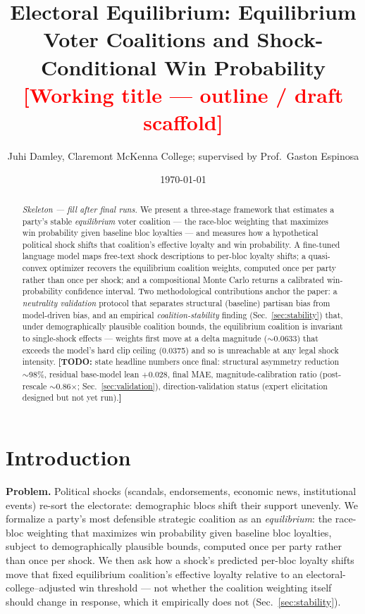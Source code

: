 \documentclass[11pt]{article}
\title{Electoral Equilibrium: Equilibrium Voter Coalitions and
Shock-Conditional Win Probability\\[4pt]
\large\textcolor{red}{[Working title --- outline / draft scaffold]}}
\author{Juhi Damley,
Claremont McKenna College; supervised by Prof.~Gaston Espinosa}
\date{\today}
\newcommand{\todo}[1]{{\color{red}\textbf{[TODO:} #1\textbf{]}}}
\newcommand{\stub}[1]{{\color{RoyalBlue}\emph{#1}}}
\begin{document}
\maketitle

\begin{abstract}
\stub{Skeleton --- fill after final runs.}
We present a three-stage framework that estimates a party's stable
\emph{equilibrium} voter coalition --- the race-bloc weighting that maximizes
win probability given baseline bloc loyalties --- and measures how a
hypothetical political shock shifts that coalition's effective loyalty and win
probability. A fine-tuned language model maps free-text shock descriptions to
per-bloc loyalty shifts; a quasi-convex optimizer recovers the equilibrium
coalition weights, computed once per party rather than once per shock; and a
compositional Monte Carlo returns a calibrated win-probability confidence
interval. Two methodological contributions anchor the paper: a \emph{neutrality
validation} protocol that separates structural (baseline) partisan bias from
model-driven bias, and an empirical \emph{coalition-stability} finding
(Sec.~\ref{sec:stability}) that, under demographically plausible coalition
bounds, the equilibrium coalition is invariant to single-shock effects ---
weights first move at a delta magnitude ($\sim$0.0633) that exceeds the model's
hard clip ceiling (0.0375) and so is unreachable at any legal shock intensity.
\todo{state headline numbers once final: structural asymmetry reduction
$\sim$98\%, residual base-model lean $+0.028$, final MAE, magnitude-calibration
ratio (post-rescale $\sim$0.86$\times$; Sec.~\ref{sec:validation}),
direction-validation status (expert elicitation designed but not yet run).}
\end{abstract}

\section{Introduction}
\textbf{Problem.} Political shocks (scandals, endorsements, economic news,
institutional events) re-sort the electorate: demographic blocs shift their
support unevenly. We formalize a party's most defensible strategic coalition as
an \emph{equilibrium}: the race-bloc weighting that maximizes win probability
given baseline bloc loyalties, subject to demographically plausible bounds,
computed once per party rather than once per shock. We then ask how a shock's
predicted per-bloc loyalty shifts move that fixed equilibrium coalition's
effective loyalty relative to an electoral-college--adjusted win threshold ---
not whether the coalition weighting itself should change in response, which it
empirically does not (Sec.~\ref{sec:stability}).
\end{document}
